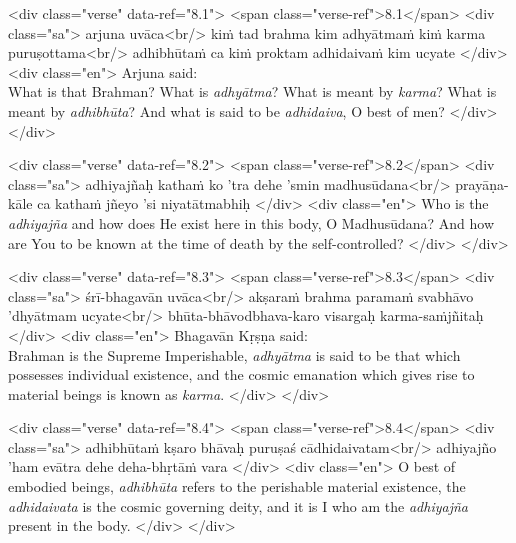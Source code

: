 \begin{html}
<div class="verse" data-ref="8.1">
  <span class="verse-ref">8.1</span>
  <div class="sa">
    arjuna uvāca<br/>
    kiṁ tad brahma kim adhyātmaṁ kiṁ karma puruṣottama<br/>
    adhibhūtaṁ ca kiṁ proktam adhidaivaṁ kim ucyate
  </div>
  <div class="en">
    \hspace*{1em}Arjuna said: \\ What is that Brahman? What is \textit{adhyātma}? What is meant by \textit{karma}? What is meant by \textit{adhibhūta}? And what is said to be \textit{adhidaiva}, O best of men?
  </div>
</div>
\end{html}



\begin{html}
<div class="verse" data-ref="8.2">
  <span class="verse-ref">8.2</span>
  <div class="sa">
    adhiyajñaḥ kathaṁ ko ’tra dehe ’smin madhusūdana<br/>
    prayāṇa-kāle ca kathaṁ jñeyo ’si niyatātmabhiḥ
  </div>
  <div class="en">
    Who is the \textit{adhiyajña} and how does He exist here in this body, O Madhusūdana? And how are You to be known at the time of death by the self-controlled?
  </div>
</div>
\end{html}



\begin{html}
<div class="verse" data-ref="8.3">
  <span class="verse-ref">8.3</span>
  <div class="sa">
    śrī-bhagavān uvāca<br/>
    akṣaraṁ brahma paramaṁ svabhāvo ’dhyātmam ucyate<br/>
    bhūta-bhāvodbhava-karo visargaḥ karma-saṁjñitaḥ
  </div>
  <div class="en">
    \hspace*{1em}Bhagavān Kṛṣṇa said: \\ Brahman is the Supreme Imperishable, \textit{adhyātma} is said to be that which possesses individual existence, and the cosmic emanation which gives rise to material beings is known as \textit{karma}.
  </div>
</div>
\end{html}



\begin{html}
<div class="verse" data-ref="8.4">
  <span class="verse-ref">8.4</span>
  <div class="sa">
    adhibhūtaṁ kṣaro bhāvaḥ puruṣaś cādhidaivatam<br/>
    adhiyajño ’ham evātra dehe deha-bhṛtāṁ vara
  </div>
  <div class="en">
    O best of embodied beings, \textit{adhibhūta} refers to the perishable material existence, the \textit{adhidaivata} is the cosmic governing deity, and it is I who am the \textit{adhiyajña} present in the body.
  </div>
</div>
\end{html}




